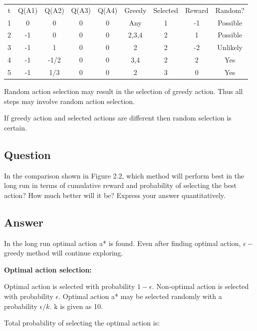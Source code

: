 \documentclass{article}
\begin{document}
    \begin{table}%
        \begin{tabular}{ccccccccc}
            t & Q(A1) & Q(A2) & Q(A3) & Q(A4) & Greedy & Selected & Reward & Random?  \\
            1 & 0     & 0     & 0  &  0  & Any    & 1        & -1     & Possible \\
            2 & -1    & 0     & 0  & 0   & 2,3,4  & 2        & 1      & Possible \\
            3 & -1    & 1     & 0   & 0  & 2      & 2        & -2     & Unlikely \\
            4 & -1    & -1/2  & 0  & 0   & 3,4    & 2        & 2      & Yes      \\
            5 & -1    & 1/3   & 0   & 0  & 2      & 3        & 0      & Yes\\
        \end{tabular}
    \end{table}

    Random action selection may result in the selection of greedy action.
    Thus all steps may involve random action selection.

    If greedy action and selected actions are different then random selection is certain.

    \subsection{Question}

    In the comparison shown in Figure 2.2, which method will perform best in the long run in
    terms of cumulative reward and probability of selecting the best action? How much better will it be?
    Express your answer quantitatively.

    \subsection*{Answer}

    In the long run optimal action a* is found.
    Even after finding optimal action, $\epsilon-$greedy method will continue exploring.

    \textbf{Optimal action selection:}

    Optimal action is selected with probability $1-\epsilon$.
    Non-optimal action is selected with probability $\epsilon$.
    Optimal action a* may be selected randomly with a probability $\epsilon/k$.
    k is given as 10.

    Total probability of selecting the optimal action is:
\end{document}
